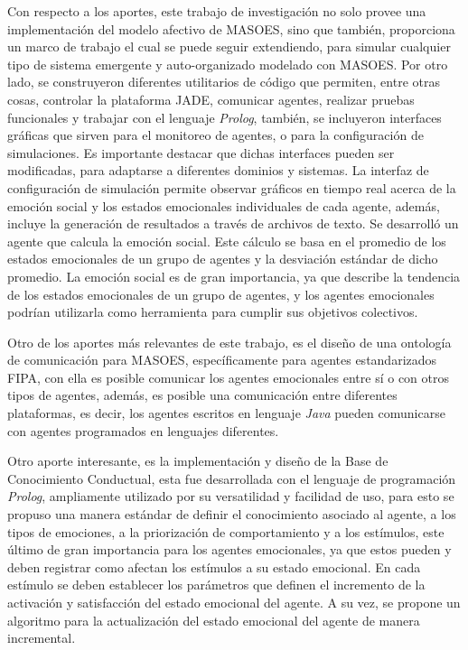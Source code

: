 Con respecto a los aportes, este trabajo de investigación no solo
provee una implementación del modelo afectivo de MASOES, sino que también,
proporciona un marco de trabajo el cual se puede seguir extendiendo,
para simular cualquier tipo de sistema emergente y auto-organizado modelado con MASOES.
Por otro lado, se construyeron diferentes utilitarios de código que permiten,
entre otras cosas, controlar la plataforma JADE, comunicar agentes, realizar pruebas funcionales y
trabajar con el lenguaje \textit{Prolog}, también, se incluyeron interfaces gráficas
que sirven para el monitoreo de agentes, o para la configuración de simulaciones.
Es importante destacar que dichas interfaces pueden ser modificadas, para
adaptarse a diferentes dominios y sistemas.
La interfaz de configuración de simulación permite observar gráficos en tiempo real
acerca de la emoción social y los estados emocionales individuales de cada agente,
además, incluye la generación de resultados a través de archivos de texto.
Se desarrolló un agente que calcula la emoción social.
Este cálculo se basa en el promedio de los estados emocionales de un grupo de agentes y
la desviación estándar de dicho promedio. La emoción social es de gran importancia,
ya que describe la tendencia de los estados emocionales de un grupo de agentes,
y los agentes emocionales podrían utilizarla como herramienta para cumplir
sus objetivos colectivos.

Otro de los aportes más relevantes de este trabajo, es el diseño de una ontología de
comunicación para MASOES, específicamente para agentes estandarizados FIPA, con ella
es posible comunicar los agentes emocionales entre sí o con otros tipos de agentes,
además, es posible una comunicación entre diferentes plataformas,
es decir, los agentes escritos en lenguaje \textit{Java} pueden comunicarse
con agentes programados en lenguajes diferentes.

Otro aporte interesante, es la implementación y diseño de la Base de Conocimiento
Conductual, esta fue desarrollada con el lenguaje de programación \textit{Prolog},
ampliamente utilizado por su versatilidad y facilidad de uso, para esto
se propuso una manera estándar de definir el conocimiento asociado
al agente, a los tipos de emociones, a la priorización de comportamiento y a los estímulos,
este último de gran importancia para los agentes emocionales, ya que estos
pueden y deben registrar como afectan los estímulos a su estado emocional.
En cada estímulo se deben establecer los parámetros
que definen el incremento de la activación y satisfacción del estado emocional del agente.
A su vez, se propone un algoritmo para la
actualización del estado emocional del agente de manera incremental.

